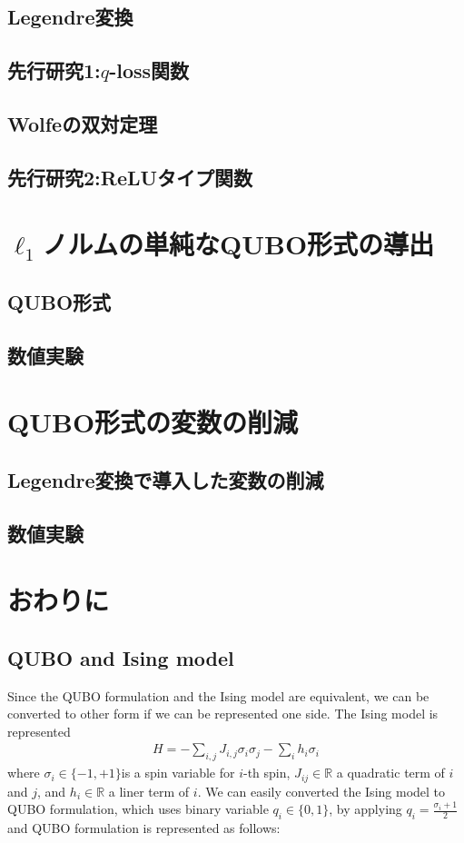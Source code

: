 \documentclass[fp,twocolumn]{jpsj3}
\begin{document}
\subsection{Legendre変換}
\subsection{先行研究1:$q$-loss関数}
\subsection{Wolfeの双対定理}
\subsection{先行研究2:ReLUタイプ関数}
\section{$\ell_{1}$ノルムの単純なQUBO形式の導出}
\subsection{QUBO形式}
\subsection{数値実験}
\section{QUBO形式の変数の削減}
\subsection{Legendre変換で導入した変数の削減}
\subsection{数値実験}
\section{おわりに}

\subsection{QUBO and Ising model} %
Since the QUBO formulation and the Ising model are equivalent, we can be converted to other form if we can be represented one side. The Ising model is represented 
\begin{eqnarray}
  H=-\sum_{i,j}{J_{i,j}\sigma_{i}\sigma_{j}}-\sum_{i}{h_{i}\sigma_{i}}
\end{eqnarray}
where $\sigma_{i}\in \{-1,+1\}$is a spin variable for $i$-th spin, $J_{ij}\in \mathbb{R}$ a quadratic term of $i$ and $j$, and $h_{i}\in \mathbb{R}$ a liner term of $i$. We can easily converted the Ising model to QUBO formulation, which uses binary variable $q_{i}\in \{0,1\}$, by applying $q_{i}=\frac{\sigma_{i}+1}{2}$ and QUBO formulation is represented as follows:
\end{document}
